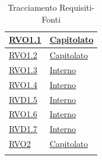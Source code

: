 \begin{longtable}{|>{\centering}m{5cm}|m{5cm}<{\centering}|}
\hyperlink{RVO1.1}{RVO1.1} & \hyperlink{Capitolato}{Capitolato}\\ \hline

\hyperlink{RVO1.2}{RVO1.2} & \hyperlink{Capitolato}{Capitolato}\\ \hline

\hyperlink{RVO1.3}{RVO1.3} & \hyperlink{Interno}{Interno}\\ \hline

\hyperlink{RVO1.4}{RVO1.4} & \hyperlink{Interno}{Interno}\\ \hline

\hyperlink{RVD1.5}{RVD1.5} & \hyperlink{Interno}{Interno}\\ \hline

\hyperlink{RVO1.6}{RVO1.6} & \hyperlink{Interno}{Interno}\\ \hline

\hyperlink{RVD1.7}{RVD1.7} & \hyperlink{Interno}{Interno}\\ \hline

\hyperlink{RVO2}{RVO2} & \hyperlink{Capitolato}{Capitolato}\\ \hline

\caption[Tracciamento Requisiti-Fonti]{Tracciamento Requisiti-Fonti}
\label{tabella:requi-fonti}
\end{longtable}
\clearpage

